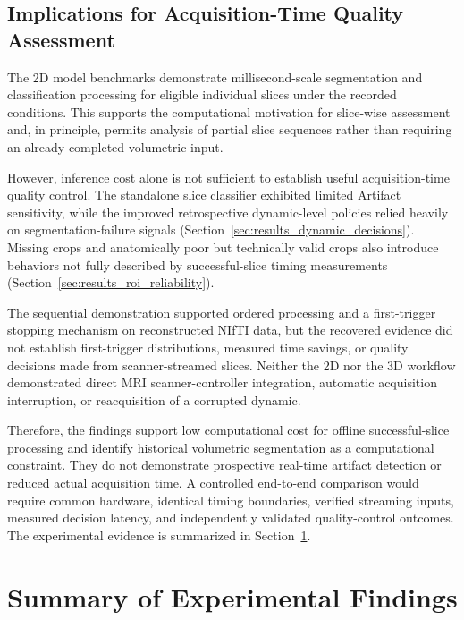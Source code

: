 \subsection{Implications for Acquisition-Time Quality Assessment}
\label{subsec:results_acquisition_time_implications}

The 2D model benchmarks demonstrate millisecond-scale segmentation and classification processing for eligible individual slices under the recorded conditions. This supports the computational motivation for slice-wise assessment and, in principle, permits analysis of partial slice sequences rather than requiring an already completed volumetric input.

However, inference cost alone is not sufficient to establish useful acquisition-time quality control. The standalone slice classifier exhibited limited Artifact sensitivity, while the improved retrospective dynamic-level policies relied heavily on segmentation-failure signals (Section~\ref{sec:results_dynamic_decisions}). Missing crops and anatomically poor but technically valid crops also introduce behaviors not fully described by successful-slice timing measurements (Section~\ref{sec:results_roi_reliability}).

The sequential demonstration supported ordered processing and a first-trigger stopping mechanism on reconstructed NIfTI data, but the recovered evidence did not establish first-trigger distributions, measured time savings, or quality decisions made from scanner-streamed slices. Neither the 2D nor the 3D workflow demonstrated direct MRI scanner-controller integration, automatic acquisition interruption, or reacquisition of a corrupted dynamic.

Therefore, the findings support low computational cost for offline successful-slice processing and identify historical volumetric segmentation as a computational constraint. They do not demonstrate prospective real-time artifact detection or reduced actual acquisition time. A controlled end-to-end comparison would require common hardware, identical timing boundaries, verified streaming inputs, measured decision latency, and independently validated quality-control outcomes. The experimental evidence is summarized in Section~\ref{sec:results_summary}.

\section{Summary of Experimental Findings}
\label{sec:results_summary}

